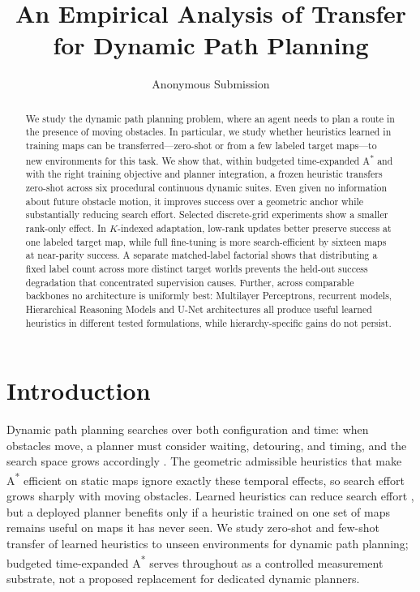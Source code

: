 \documentclass[letterpaper]{article} %
\title{An Empirical Analysis of Transfer for Dynamic Path Planning}
\author{
    Anonymous Submission
}
\begin{document}
\maketitle

\begin{abstract}
We study the dynamic path planning problem, where an agent needs to plan a route in the presence of moving obstacles. In particular, we study whether heuristics learned in training maps can be transferred---zero-shot or from a few labeled target maps---to new environments for this task. We show that, within budgeted time-expanded A\textsuperscript{*} and with the right training objective and planner integration, a frozen heuristic transfers zero-shot across six procedural continuous dynamic suites. Even given no information about future obstacle motion, it improves success over a geometric anchor while substantially reducing search effort. Selected discrete-grid experiments show a smaller rank-only effect. In $K$-indexed adaptation, low-rank updates better preserve success at one labeled target map, while full fine-tuning is more search-efficient by sixteen maps at near-parity success. A separate matched-label factorial shows that distributing a fixed label count across more distinct target worlds prevents the held-out success degradation that concentrated supervision causes. Further, across comparable backbones no architecture is uniformly best: Multilayer Perceptrons, recurrent models, Hierarchical Reasoning Models and U-Net architectures all produce useful learned heuristics in different tested formulations, while hierarchy-specific gains do not persist.
\end{abstract}

\section{Introduction}

Dynamic path planning searches over both configuration and time: when obstacles move, a planner must consider waiting, detouring, and timing, and the search space grows accordingly \citep{silver2005cooperative,phillips2011sipp}. The geometric admissible heuristics that make A\textsuperscript{*} \citep{hart1968astar} efficient on static maps ignore exactly these temporal effects, so search effort grows sharply with moving obstacles. Learned heuristics can reduce search effort \citep{arfaee2011bootstrap,bhardwaj2017sail,yonetani2021neuralastar}, but a deployed planner benefits only if a heuristic trained on one set of maps remains useful on maps it has never seen. We study zero-shot and few-shot transfer of learned heuristics to unseen environments for dynamic path planning; budgeted time-expanded A\textsuperscript{*} serves throughout as a controlled measurement substrate, not a proposed replacement for dedicated dynamic planners.
\end{document}
